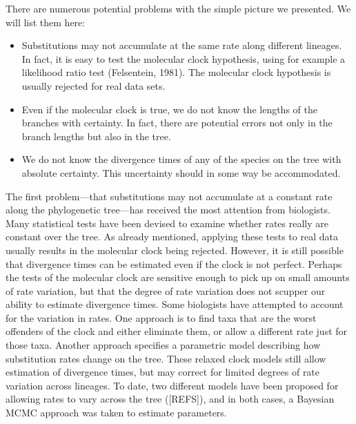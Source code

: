 \documentclass{svmult}
\begin{document}
There are numerous potential problems with the simple picture we presented. We will list them here:
\begin{itemize}
\item Substitutions may not accumulate at the same rate along different lineages. In fact, it is easy to test the molecular clock hypothesis, using
for example a likelihood ratio test (Felsentein, 1981). The molecular clock hypothesis is usually rejected for real data sets. 

\item Even if the molecular clock is true, we do not know the lengths of the branches with certainty. In fact, there are potential errors not
only in the branch lengths but also in the tree.

\item We do not know the divergence times of any of the species on the tree with absolute certainty. This uncertainty should in some way be accommodated.
\end{itemize}
The first problem---that substitutions may not accumulate at a constant rate along the phylogenetic tree---has received the most attention from biologists. 
Many statistical tests have been devised to examine whether rates really are constant over the tree. As already mentioned, applying these tests to
real data usually results in the molecular clock being rejected. However, it is still possible that divergence times can be estimated even if the clock
is not perfect. Perhaps the tests of the molecular clock are sensitive enough to pick up on small amounts of rate variation, but that the degree of rate variation
does not scupper our ability to estimate divergence times.
Some biologists have attempted to account for the variation in rates. One approach is to find taxa that are the worst offenders of the clock and either eliminate
them, or allow a different rate just for those taxa. Another approach specifies a parametric model describing how substitution rates change on the tree. These
relaxed clock models still allow estimation of divergence times, but may correct for limited degrees of rate variation across lineages. To date, two different
models have been proposed for allowing rates to vary across the tree ([REFS]), and in both cases, a Bayesian MCMC approach was taken to estimate parameters.
\end{document}
